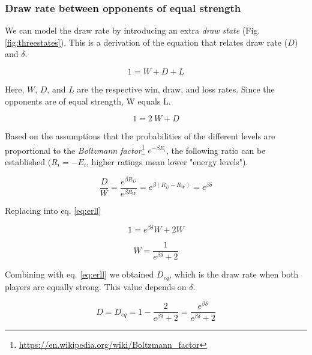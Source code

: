 \documentclass[12pt]{article}
\begin{document}

\subsubsection*{Draw rate between opponents of equal strength}

We can model the draw rate by introducing an extra \textit{draw state} (Fig. \ref{fig:threestates}). 
This is a derivation of the equation that relates draw rate ($D$) and $\delta$.

	\begin{equation} \label{eq:basic_WDL}
	1 = W + D + L
	\end{equation}

Here, $W$, $D$, and $L$ are the respective win, draw, and loss rates. Since the opponents are of equal strength, W equals L.

	\begin{equation} \label{eq:erll}
	1 = 2\: W + D 
	\end{equation}

Based on the assumptions that the probabilities of the different levels are proportional to the \textit{Boltzmann factor}\footnote{\url{https://en.wikipedia.org/wiki/Boltzmann_factor}} $e^{-\beta E_{i}}$, the following ratio can be established ($R_{i}=-E_{i}$, higher ratings mean lower "energy levels").

	\begin{equation} 
	\frac{D}{W} = \frac{e^{\beta R_{D}}}{e^{\beta R_{W}}}  = e^{\beta(R_{D}-R_{W})} = e^{\beta\delta}
	\end{equation}

Replacing into eq. \ref{eq:erll}

	\begin{equation} 
	1 = e^{\beta\delta} W + 2W
	\end{equation}

	\begin{equation} \label{eq:wdep}
	W = \frac{1}{e^{\beta\delta} + 2}
	\end{equation}

Combining with eq. \ref{eq:erll} we obtained $D_{eq}$, which is the draw rate when both players are equally strong. This value depends on $\delta$.

	\begin{equation} \label{eq:eqlog}
	D = D_{eq} = 1 - \frac {2}{e^{\beta\delta} + 2} = \frac{e^{\beta\delta}}{e^{\beta\delta}+2}
	\end{equation}

\end{document}
